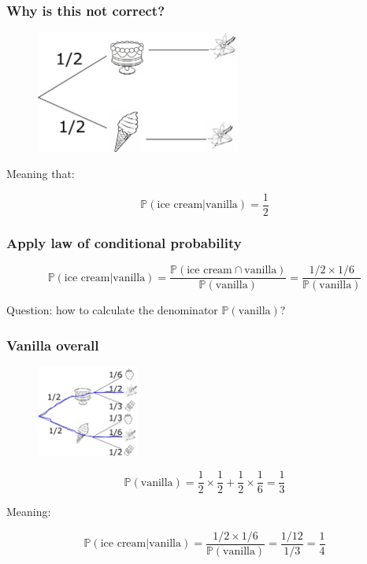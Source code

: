 \documentclass{beamer}
\begin{document}
	\begin{frame}
		\frametitle{Why is this not correct?}
		

		\begin{figure}[ht]
			\centerline{\includegraphics[width=0.6\textwidth]{./figures/tree-prob-2.pdf}}
		\end{figure}
	
	Meaning that:
	
	\begin{equation}
		\mathbb{P}(\text{ice cream}|\text{vanilla}) = \frac{1}{2}
	\end{equation}
	
	\end{frame}


	\begin{frame}
		\frametitle{Apply law of conditional probability}
		
		\begin{equation}
			\mathbb{P}(\text{ice cream}|\text{vanilla}) = \frac{\mathbb{P}(\text{ice cream} \cap \text{vanilla})}{\mathbb{P}(\text{vanilla})} = \frac{1/2 \times 1/6}{\mathbb{P}(\text{vanilla})}
		\end{equation}
	
	Question: how to calculate the denominator $\mathbb{P}(\text{vanilla})$?
		
	\end{frame}

	\begin{frame}
		\frametitle{Vanilla overall}
		
		\begin{figure}[ht]
			\centerline{\includegraphics[width=0.3\textwidth]{./figures/tree-prob-1-vanilla.pdf}}
		\end{figure}

	\begin{equation}
		\mathbb{P}(\text{vanilla}) = \frac{1}{2} \times \frac{1}{2} + \frac{1}{2} \times \frac{1}{6} = \frac{1}{3}
	\end{equation}

	Meaning:

		\begin{equation}
			\mathbb{P}(\text{ice cream}|\text{vanilla}) = \frac{1/2 \times 1/6}{\mathbb{P}(\text{vanilla})} = \frac{1/12}{1/3} = \frac{1}{4}
		\end{equation}
	
	\end{frame}
\end{document}
